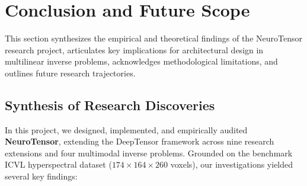 \section{Conclusion and Future Scope}
\label{sec:conclusion}

This section synthesizes the empirical and theoretical findings of the NeuroTensor research project, articulates key implications for architectural design in multilinear inverse problems, acknowledges methodological limitations, and outlines future research trajectories.

\subsection{Synthesis of Research Discoveries}
\label{subsec:synthesis}
In this project, we designed, implemented, and empirically audited \textbf{NeuroTensor}, extending the DeepTensor framework \citep{heckel2020deeptensor} across nine research extensions and four multimodal inverse problems. Grounded on the benchmark ICVL hyperspectral dataset ($174 \times 164 \times 260$ voxels), our investigations yielded several key findings:
